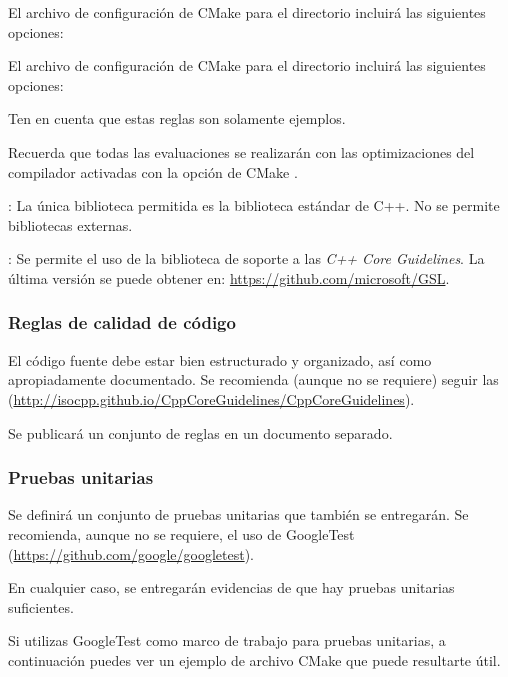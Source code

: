 El archivo de configuración de CMake para el directorio  incluirá las
siguientes opciones:



El archivo de configuración de CMake para el directorio  incluirá las
siguientes opciones:



Ten en cuenta que estas reglas son solamente ejemplos.

Recuerda que todas las evaluaciones se realizarán con las optimizaciones del
compilador activadas con la opción de CMake
.

: 
La única biblioteca permitida es la biblioteca estándar de C++.
No se permite bibliotecas externas.

: 
Se permite el uso de la biblioteca de soporte a las \emph{C++ Core Guidelines}.
La última versión se puede obtener en:
\url{https://github.com/microsoft/GSL}.

\subsubsection{Reglas de calidad de código}

El código fuente debe estar bien estructurado y organizado, así como
apropiadamente documentado.
Se recomienda (aunque no se requiere) seguir las 
(\url{http://isocpp.github.io/CppCoreGuidelines/CppCoreGuidelines}).

Se publicará un conjunto de reglas en un documento separado.

\subsubsection{Pruebas unitarias}

Se definirá un conjunto de pruebas unitarias que también se entregarán.
Se recomienda, aunque no se requiere, el uso de GoogleTest
(\url{https://github.com/google/googletest}).

En cualquier caso, se entregarán evidencias de que hay pruebas unitarias
suficientes.

Si utilizas GoogleTest como marco de trabajo para pruebas unitarias,
a continuación puedes ver un ejemplo de archivo CMake que puede resultarte útil.

